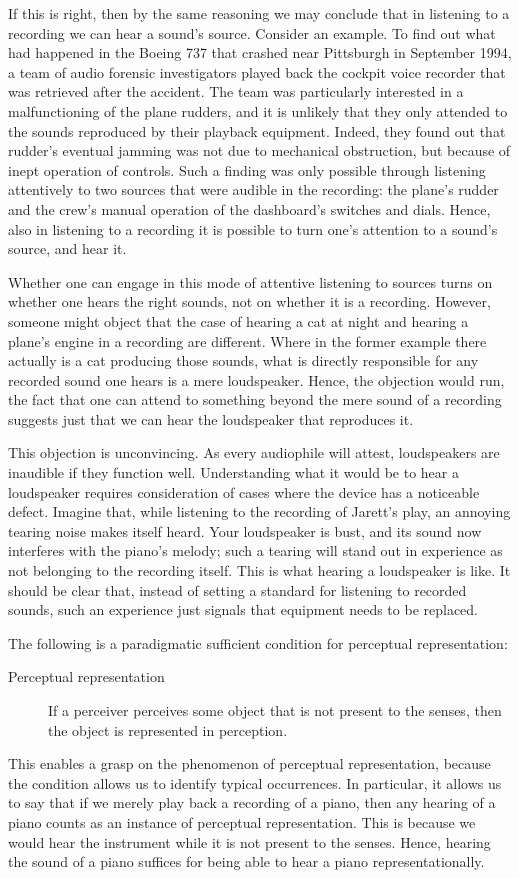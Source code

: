 \documentclass[sloppy, journal, git, anonymise, dodraft]{humapap}
\begin{document}
If this is right, then by the same reasoning we may conclude that in
listening to a recording we can hear a sound's source. Consider an
example. To find out what had happened in the Boeing 737 that crashed
near Pittsburgh in September 1994, a team of audio forensic
investigators played back the cockpit voice recorder that was retrieved
after the accident. The team was particularly interested in a
malfunctioning of the plane rudders, and it is unlikely that they only
attended to the sounds reproduced by their playback equipment. Indeed,
they found out that rudder's eventual jamming was not due to mechanical
obstruction, but because of inept operation of controls. Such a finding
was only possible through listening attentively to two sources that were
audible in the recording: the plane's rudder and the crew's manual
operation of the dashboard's switches and dials. Hence, also in listening to a
recording it is possible to turn one's attention to a sound's source,
and hear it.

Whether one can engage in this mode of attentive listening to sources turns on whether one hears the right sounds, not on whether it is a
recording. However, someone might object that the case of hearing
a cat at night and hearing a plane's engine in a recording are
different. Where in the former example there actually is a cat producing
those sounds, what is directly responsible for any recorded sound one
hears is a mere loudspeaker. Hence, the objection would run, the fact
that one can attend to something beyond the mere sound of a recording
suggests just that we can hear the loudspeaker that reproduces it.

This objection is unconvincing. As every audiophile will
attest, loudspeakers are inaudible if they function well. Understanding
what it would be to hear a loudspeaker requires consideration of cases
where the device has a noticeable defect. Imagine that, while listening to the recording of Jarett's play, an annoying
tearing noise makes itself heard. Your loudspeaker is bust, and its sound
now interferes with the piano's melody; such a tearing will stand
out in experience as not belonging to the recording itself. This is what
hearing a loudspeaker is like. It should be clear that, instead of
setting a standard for listening to recorded sounds, such an experience
just signals that equipment needs to be replaced.

\sect The following is a paradigmatic sufficient condition for perceptual
representation:
\begin{description}
\item[Perceptual representation] If a perceiver perceives some object that is not present to the senses, then the object is represented in perception.
\end{description}
This enables a grasp on the phenomenon of perceptual representation,
because the condition allows us to identify typical occurrences. In
particular, it allows us to say that if we merely play back a recording
of a piano, then any hearing of a piano counts as an instance of
perceptual representation. This is because we would hear the instrument
while it is not present to the senses. Hence, hearing the sound of a
piano suffices for being able to hear a piano representationally.
\end{document}
